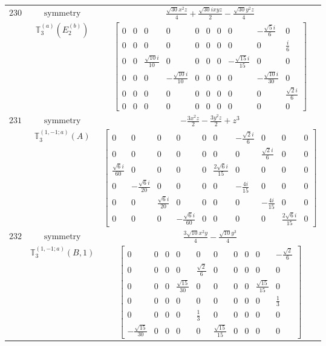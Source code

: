 \documentclass[fleqn,8pt,landscape]{jsarticle}
\begin{document}
\begin{longtable}{ccc}
$ 230 $ & $ \text{symmetry} $ & $ \frac{\sqrt{30} x^{2} z}{4} + \frac{\sqrt{30} i x y z}{2} - \frac{\sqrt{30} y^{2} z}{4} $ \\
$  $ & $ \mathbb{T}_{3}^{(a)}(E_{2}^{(b)}) $ & $ \begin{bmatrix} 0 & 0 & 0 & 0 & 0 & 0 & 0 & 0 & - \frac{\sqrt{5} i}{6} & 0 \\ 0 & 0 & 0 & 0 & 0 & 0 & 0 & 0 & 0 & \frac{i}{6} \\ 0 & 0 & \frac{\sqrt{10} i}{10} & 0 & 0 & 0 & 0 & - \frac{\sqrt{15} i}{15} & 0 & 0 \\ 0 & 0 & 0 & - \frac{\sqrt{10} i}{10} & 0 & 0 & 0 & 0 & - \frac{\sqrt{10} i}{30} & 0 \\ 0 & 0 & 0 & 0 & 0 & 0 & 0 & 0 & 0 & \frac{\sqrt{2} i}{6} \\ 0 & 0 & 0 & 0 & 0 & 0 & 0 & 0 & 0 & 0 \end{bmatrix} $ \\ \hline
$ 231 $ & $ \text{symmetry} $ & $ - \frac{3 x^{2} z}{2} - \frac{3 y^{2} z}{2} + z^{3} $ \\
$  $ & $ \mathbb{T}_{3}^{(1,-1;a)}(A) $ & $ \begin{bmatrix} 0 & 0 & 0 & 0 & 0 & 0 & - \frac{\sqrt{2} i}{6} & 0 & 0 & 0 \\ 0 & 0 & 0 & 0 & 0 & 0 & 0 & \frac{\sqrt{2} i}{6} & 0 & 0 \\ \frac{\sqrt{6} i}{60} & 0 & 0 & 0 & 0 & \frac{2 \sqrt{6} i}{15} & 0 & 0 & 0 & 0 \\ 0 & - \frac{\sqrt{6} i}{20} & 0 & 0 & 0 & 0 & - \frac{4 i}{15} & 0 & 0 & 0 \\ 0 & 0 & \frac{\sqrt{6} i}{20} & 0 & 0 & 0 & 0 & - \frac{4 i}{15} & 0 & 0 \\ 0 & 0 & 0 & - \frac{\sqrt{6} i}{60} & 0 & 0 & 0 & 0 & \frac{2 \sqrt{6} i}{15} & 0 \end{bmatrix} $ \\ \hline
$ 232 $ & $ \text{symmetry} $ & $ \frac{3 \sqrt{10} x^{2} y}{4} - \frac{\sqrt{10} y^{3}}{4} $ \\
$  $ & $ \mathbb{T}_{3}^{(1,-1;a)}(B,1) $ & $ \begin{bmatrix} 0 & 0 & 0 & 0 & 0 & 0 & 0 & 0 & 0 & - \frac{\sqrt{2}}{6} \\ 0 & 0 & 0 & 0 & \frac{\sqrt{2}}{6} & 0 & 0 & 0 & 0 & 0 \\ 0 & 0 & 0 & \frac{\sqrt{15}}{30} & 0 & 0 & 0 & 0 & \frac{\sqrt{15}}{15} & 0 \\ 0 & 0 & 0 & 0 & 0 & 0 & 0 & 0 & 0 & \frac{1}{3} \\ 0 & 0 & 0 & 0 & \frac{1}{3} & 0 & 0 & 0 & 0 & 0 \\ - \frac{\sqrt{15}}{30} & 0 & 0 & 0 & 0 & \frac{\sqrt{15}}{15} & 0 & 0 & 0 & 0 \end{bmatrix} $ \\ \hline

\end{longtable}
\end{document}
